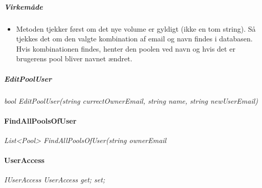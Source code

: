 \subparagraph{Virkemåde}
\begin{itemize}
	\item Metoden tjekker først om det nye volume er gyldigt (ikke en tom string). Så tjekkes det om den valgte kombination af email og navn findes i databasen. Hvis kombinationen findes, henter den poolen ved navn og hvis det er brugerens pool bliver navnet ændret.
\end{itemize}





\subparagraph{EditPoolUser}%

\textit{bool EditPoolUser(string currectOwnerEmail, string name, string newUserEmail)}

\paragraph{FindAllPoolsOfUser}%

\textit{List<Pool> FindAllPoolsOfUser(string ownerEmail}

\paragraph{UserAccess}%

\textit{IUserAccess UserAccess { get; set; }}
